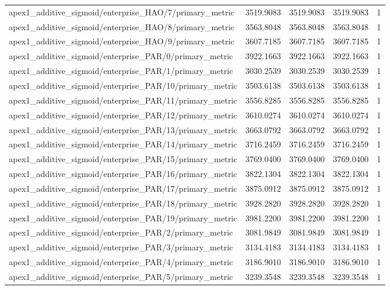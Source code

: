 \begin{table}[h]
\begin{tabular}{lrrrr}
apex1_additive_sigmoid/enterprise_HAO/7/primary_metric & 3519.9083 & 3519.9083 & 3519.9083 & 1 \\
apex1_additive_sigmoid/enterprise_HAO/8/primary_metric & 3563.8048 & 3563.8048 & 3563.8048 & 1 \\
apex1_additive_sigmoid/enterprise_HAO/9/primary_metric & 3607.7185 & 3607.7185 & 3607.7185 & 1 \\
apex1_additive_sigmoid/enterprise_PAR/0/primary_metric & 3922.1663 & 3922.1663 & 3922.1663 & 1 \\
apex1_additive_sigmoid/enterprise_PAR/1/primary_metric & 3030.2539 & 3030.2539 & 3030.2539 & 1 \\
apex1_additive_sigmoid/enterprise_PAR/10/primary_metric & 3503.6138 & 3503.6138 & 3503.6138 & 1 \\
apex1_additive_sigmoid/enterprise_PAR/11/primary_metric & 3556.8285 & 3556.8285 & 3556.8285 & 1 \\
apex1_additive_sigmoid/enterprise_PAR/12/primary_metric & 3610.0274 & 3610.0274 & 3610.0274 & 1 \\
apex1_additive_sigmoid/enterprise_PAR/13/primary_metric & 3663.0792 & 3663.0792 & 3663.0792 & 1 \\
apex1_additive_sigmoid/enterprise_PAR/14/primary_metric & 3716.2459 & 3716.2459 & 3716.2459 & 1 \\
apex1_additive_sigmoid/enterprise_PAR/15/primary_metric & 3769.0400 & 3769.0400 & 3769.0400 & 1 \\
apex1_additive_sigmoid/enterprise_PAR/16/primary_metric & 3822.1304 & 3822.1304 & 3822.1304 & 1 \\
apex1_additive_sigmoid/enterprise_PAR/17/primary_metric & 3875.0912 & 3875.0912 & 3875.0912 & 1 \\
apex1_additive_sigmoid/enterprise_PAR/18/primary_metric & 3928.2820 & 3928.2820 & 3928.2820 & 1 \\
apex1_additive_sigmoid/enterprise_PAR/19/primary_metric & 3981.2200 & 3981.2200 & 3981.2200 & 1 \\
apex1_additive_sigmoid/enterprise_PAR/2/primary_metric & 3081.9849 & 3081.9849 & 3081.9849 & 1 \\
apex1_additive_sigmoid/enterprise_PAR/3/primary_metric & 3134.4183 & 3134.4183 & 3134.4183 & 1 \\
apex1_additive_sigmoid/enterprise_PAR/4/primary_metric & 3186.9010 & 3186.9010 & 3186.9010 & 1 \\
apex1_additive_sigmoid/enterprise_PAR/5/primary_metric & 3239.3548 & 3239.3548 & 3239.3548 & 1 \\

\end{tabular}
\end{table}
